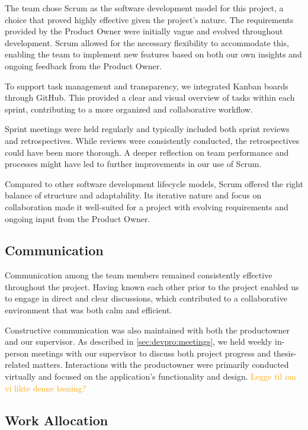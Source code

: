 The team chose Scrum as the software development model for this project, a choice that proved highly effective given the project's nature. The requirements provided by the \gls{Product Owner} were initially vague and evolved throughout development. Scrum allowed for the necessary flexibility to accommodate this, enabling the team to implement new features based on both our own insights and ongoing feedback from the \gls{Product Owner}.

To support task management and transparency, we integrated Kanban boards through GitHub. This provided a clear and visual overview of tasks within each sprint, contributing to a more organized and collaborative workflow.

Sprint meetings were held regularly and typically included both sprint reviews and retrospectives. While reviews were consistently conducted, the retrospectives could have been more thorough. A deeper reflection on team performance and processes might have led to further improvements in our use of Scrum.

Compared to other software development lifecycle models, Scrum offered the right balance of structure and adaptability. Its iterative nature and focus on collaboration made it well-suited for a project with evolving requirements and ongoing input from the \gls{Product Owner}.

\subsection{Communication}

Communication among the team members remained consistently effective throughout the project. Having known each other prior to the project enabled us to engage in direct and clear discussions, which contributed to a collaborative environment that was both calm and efficient.

Constructive communication was also maintained with both the \gls{productowner} and our supervisor. As described in \autoref{sec:devpro:meetings}, we held weekly in-person meetings with our supervisor to discuss both project progress and thesis-related matters. Interactions with the \gls{productowner} were primarily conducted virtually and focused on the application's functionality and design. \textcolor{orange}{Legge til om vi likte denne løsning?}

\subsection{Work Allocation}

